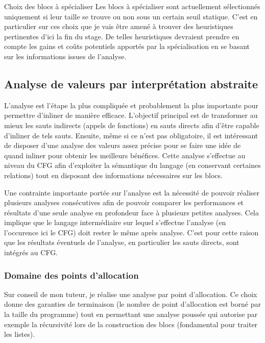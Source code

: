 \documentclass{beamer}
\begin{document}
\begin{frame}{Choix des blocs à spécialiser}
    Les blocs à spécialiser sont actuellement sélectionnés uniquement si leur taille se trouve ou non sous un certain seuil statique. C'est en particulier sur ces choix que je vais être amené à trouver des heuristiques pertinentes d'ici la fin du stage. De telles heuristiques devraient prendre en compte les gains et coûts potentiels apportés par la spécialisation en se basant sur les informations issues de l'analyse.
\end{frame}

\subsection{Analyse de valeurs par interprétation abstraite}

L'analyse est l'étape la plus compliquée et probablement la plus importante pour permettre d'inliner de manière efficace. L'objectif principal est de transformer au mieux les sauts indirects (appels de fonctions) en sauts directs afin d'être capable d'inliner de tels sauts. Ensuite, même si ce n'est pas obligatoire, il est intéressant de disposer d'une analyse des valeurs assez précise pour se faire une idée de quand inliner pour obtenir les meilleurs bénéfices. Cette analyse s'effectue au niveau du CFG afin d'exploiter la sémantique du langage (en conservant certaines relations) tout en disposant des informations nécessaires sur les blocs.

Une contrainte importante portée sur l'analyse est la nécessité de pouvoir réaliser plusieurs analyses consécutives afin de pouvoir comparer les performances et résultats d'une seule analyse en profondeur face à plusieurs petites analyses. Cela implique que le langage intermédiaire sur lequel s'effectue l'analyse (en l'occurence ici le CFG) doit rester le même après analyse. C'est pour cette raison que les résultats éventuels de l'analyse, en particulier les sauts directs, sont intégrés au CFG.

\subsubsection{Domaine des points d'allocation}

Sur conseil de mon tuteur, je réalise une analyse par point d'allocation. Ce choix donne des garanties de terminaison (le nombre de point d'allocation est borné par la taille du programme) tout en permettant une analyse poussée qui autorise par exemple la récursivité lors de la construction des blocs (fondamental pour traiter les listes).
\end{document}
